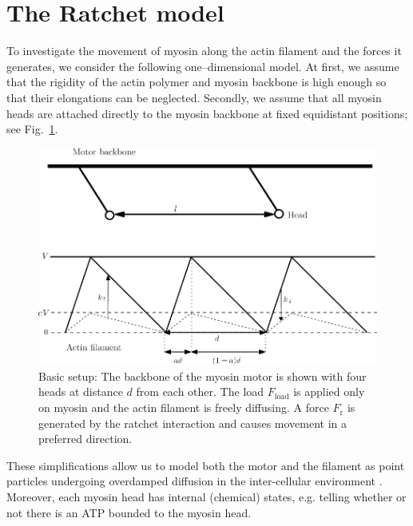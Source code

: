 \documentclass[aps,pre,twocolumn,showpacs,showkeys,superscriptaddress,floatfix]{revtex4-1}
\begin{document}
\section{The Ratchet model}
\label{sec:ratchet}
To investigate the movement of myosin along the actin filament and the forces it generates, we consider the following one--dimensional model.
At first, we assume that the rigidity of the actin polymer and myosin backbone is high enough so that their elongations can be neglected.
Secondly, we assume that all myosin heads are attached directly to the myosin backbone at fixed equidistant positions; see Fig.~\ref{fig:ratchet_setup}.
\begin{figure}[t]
\centering
\includegraphics[width=0.9\linewidth,height=!]{ratchet_illustration}
\caption{
\label{fig:ratchet_setup}
Basic setup:
The backbone of the myosin motor is shown with four heads at distance $d$ from each other. 
The load $F_\text{load}$ is applied only on myosin and the actin filament is freely diffusing.
A force $F_\text{r}$ is generated by the ratchet interaction and causes movement in a preferred direction. 
} 
\end{figure}
These simplifications allow us to model both the motor and the filament as point particles undergoing overdamped diffusion in the inter-cellular environment \cite{vanKampen1981stochastic}.
Moreover, each myosin head has internal (chemical) states, e.g. telling
 whether or not there is an ATP bounded to the myosin head. 
\end{document}
